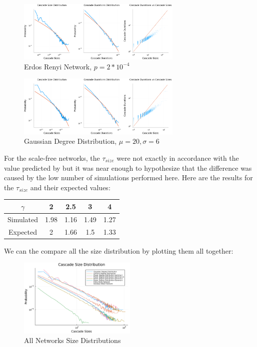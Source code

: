     \begin{figure}[H]
        \centering
        \includegraphics[width=0.7\textwidth]{images/Task15/ErdosRenyi.png}
        \caption{Erdos Renyi Network, $p = 2*10^{-4}$}
    \end{figure}

    \begin{figure}[H]
        \centering
        \includegraphics[width=0.7\textwidth]{images/Task15/RandomGaussian.png}
        \caption{Gaussian Degree Distribution, $\mu = 20, \sigma = 6$}
    \end{figure}

For the scale-free networks, the $\tau_{size}$ were not exactly in accordance with the value predicted by \cite{scale_free_sandpile} but it was near enough to hypothesize that the difference was caused by the low number of simulations performed here. Here are the results for the $\tau_{size}$  and their expected values:
\begin{table}[H]
    \centering
    \begin{tabular}{|c|c|c|c|c|}
    \hline
    $\gamma$  & 2    & 2.5  & 3    & 4    \\ \hline
    Simulated & 1.98 & 1.16 & 1.49 & 1.27 \\ \hline
    Expected  & 2    & 1.66 & 1.5  & 1.33 \\ \hline
    \end{tabular}
\end{table}



We can the compare all the size distribution by plotting them all together:

    \begin{figure}[H]
        \centering
        \includegraphics[width=0.5\textwidth]{images/Task15/AllNetworks.pdf}
        \caption{All Networks Size Distributions}
    \end{figure}

    
\newpage